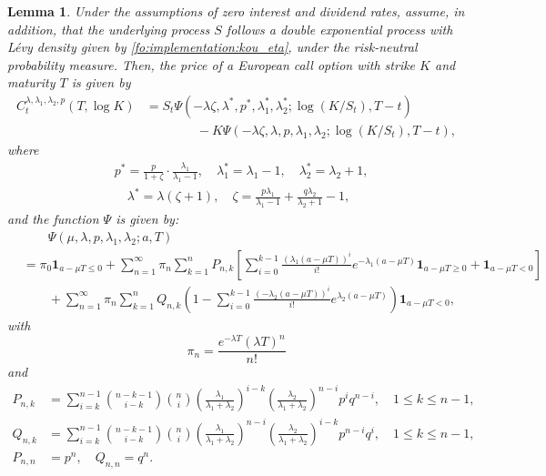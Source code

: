 \documentclass{article}
\numberwithin{equation}{section}
\newtheorem{lemma}{Lemma}
\def\bone{\mathbf{1}}
\begin{document}
\begin{lemma}\label{cor:implementation:koupricing}
Under the assumptions of zero interest and dividend rates, assume, in addition, that the underlying process $S$ follows a double exponential process with L\'{e}vy density given by \eqref{fo:implementation:kou_eta}, under the risk-neutral probability measure. Then, the price of a European call option with strike $K$ and maturity $T$ is given by
\begin{align} \label{fo:implementation:Kouprice}
C_t^{\lambda, \lambda_1, \lambda_2, p}(T,\log K) & = S_t\Psi \left( - \lambda \zeta, \lambda^*, p^*, \lambda_1^*, \lambda_2^*; \log\left(K/S_t\right), T-t \right) \nonumber \\
& \qquad \qquad - K \Psi \left( - \lambda \zeta, \lambda, p, \lambda_1, \lambda_2; \log\left(K/S_t\right), T-t \right),
\end{align}
where
\begin{align*}
& p^* = \frac{p}{1+\zeta} \cdot \frac{\lambda_1}{\lambda_1 - 1}, \quad \lambda_1^* = \lambda_1 - 1, \quad \lambda_2^* = \lambda_2 + 1,\\
& \quad \lambda^* = \lambda(\zeta+1), \quad \zeta = \frac{p\lambda_1}{\lambda_1-1} + \frac{q\lambda_2}{\lambda_2 + 1} - 1,
\end{align*}
and the function $\Psi$ is given by:
\begin{align}\label{fo:implementation:psi}
& \qquad \Psi(\mu, \lambda, p, \lambda_1, \lambda_2; a, T) \nonumber \\
& = \pi_0 \bone_{a - \mu T \leq 0} + \sum_{n=1}^\infty \pi_n \sum_{k=1}^n P_{n,k} \left[ \sum_{i=0}^{k-1} \frac{(\lambda_1 (a-\mu T))^i}{i!} e^{-\lambda_1 (a-\mu T)} \bone_{a - \mu T \geq 0} + \bone_{a - \mu T<0} \right] \nonumber \\
& \qquad + \sum_{n=1}^\infty \pi_n \sum_{k=1}^n Q_{n,k} \left( 1 - \sum_{i=0}^{k-1} \frac{(-\lambda_2 (a - \mu T))^i}{i!} e^{\lambda_2 (a-\mu T)} \right) \bone_{a - \mu T < 0},
\end{align}
with
\begin{equation*}
\pi_n = \frac{e^{-\lambda T}(\lambda T)^n}{n!}
 \end{equation*}
and
\begin{align*}
P_{n,k} & = \sum_{i = k}^{n-1}
\binom{n-k-1}{i-k} \binom{n}{i} \left(\frac{\lambda_1}{\lambda_1+\lambda_2}\right)^{i-k} \left(\frac{\lambda_2}{\lambda_1+\lambda_2}\right)^{n-i} p^i q^{n-i}, \quad 1 \leq k \leq n-1,\\
Q_{n,k} & = \sum_{i = k}^{n-1}
\binom{n-k-1}{i-k} \binom{n}{i} \left(\frac{\lambda_1}{\lambda_1+\lambda_2}\right)^{n-i} \left(\frac{\lambda_2}{\lambda_1+\lambda_2}\right)^{i-k} p^{n-i} q^i, \quad 1 \leq k \leq n-1,\\
P_{n,n} & = p^n, \quad Q_{n,n} = q^n.
\end{align*}
\end{lemma}
\end{document}
